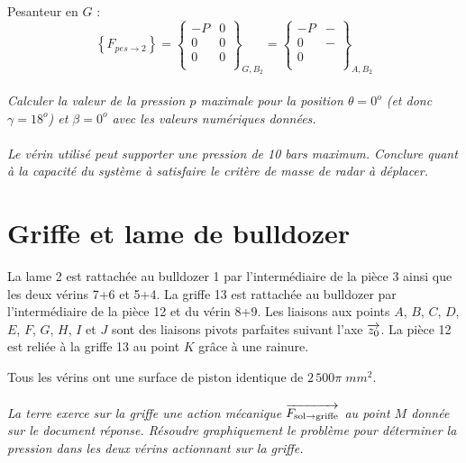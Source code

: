 \documentclass[10pt,oneside]{article}
\begin{document}
Pesanteur en $G$ :
$$
\left\{
F_{pes \rightarrow 2} 
\right\}
=
\left\{
\begin{array}{cc}
-P  & 0 \\
0 & 0 \\
0 & 0 \\
\end{array}
\right\}_{G,B_2}
=
\left\{
\begin{array}{cc}
-P  & -\\
0 & -  \\
0 &  \\
\end{array}
\right\}_{A,B_2}
$$

\paragraph{}
\textit{Calculer la valeur de la pression $p$ maximale pour la position $\theta=0^o$ (et donc $\gamma = 18^o$) et $\beta = 0^o$ avec les valeurs numériques données.}


\paragraph{}
\textit{Le vérin utilisé peut supporter une pression de 10 bars maximum. Conclure quant à la capacité du système à satisfaire le critère de masse de radar à déplacer.}



\section*{Griffe et lame de bulldozer}
\setcounter{paragraph}{0}


La lame 2 est rattachée au bulldozer 1 par l'intermédiaire de la pièce 3 ainsi que les deux vérins 7+6 et 5+4. La griffe 13 est rattachée au bulldozer par l'intermédiaire de la pièce 12 et du vérin 8+9. Les liaisons aux points $A$, $B$, $C$, $D$, $E$, $F$, $G$, $H$, $I$ et $J$ sont des liaisons pivots parfaites suivant l'axe $\overrightarrow{z_0}$. La pièce 12 est reliée à la griffe 13 au point $K$ grâce à une rainure. 

Tous les vérins ont une surface de piston identique de $2\, 500\pi\; mm^2$.

\paragraph{}
\textit{La terre exerce sur la griffe une action mécanique $\overrightarrow{F_{\text{sol}\rightarrow \text{griffe}}}$ au point $M$ donnée sur le document réponse. Résoudre graphiquement le problème pour déterminer la pression dans les deux vérins actionnant sur la griffe.}
\end{document}
